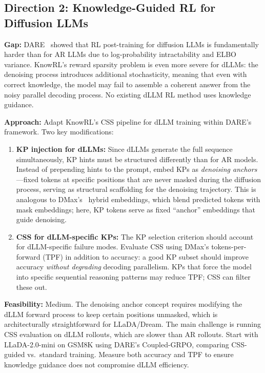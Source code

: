 \documentclass[11pt]{article}
\begin{document}
\subsection{Direction 2: Knowledge-Guided RL for Diffusion LLMs}

\textbf{Gap:} DARE~\cite{dare} showed that RL post-training for diffusion LLMs is fundamentally harder than for AR LLMs due to log-probability intractability and ELBO variance. KnowRL's reward sparsity problem is even more severe for dLLMs: the denoising process introduces additional stochasticity, meaning that even with correct knowledge, the model may fail to assemble a coherent answer from the noisy parallel decoding process. No existing dLLM RL method uses knowledge guidance.

\textbf{Approach:} Adapt KnowRL's CSS pipeline for dLLM training within DARE's framework. Two key modifications:
\begin{enumerate}
    \item \textbf{KP injection for dLLMs:} Since dLLMs generate the full sequence simultaneously, KP hints must be structured differently than for AR models. Instead of prepending hints to the prompt, embed KPs as \textit{denoising anchors}---fixed tokens at specific positions that are never masked during the diffusion process, serving as structural scaffolding for the denoising trajectory. This is analogous to DMax's~\cite{dmax} hybrid embeddings, which blend predicted tokens with mask embeddings; here, KP tokens serve as fixed ``anchor'' embeddings that guide denoising.

    \item \textbf{CSS for dLLM-specific KPs:} The KP selection criterion should account for dLLM-specific failure modes. Evaluate CSS using DMax's tokens-per-forward (TPF) in addition to accuracy: a good KP subset should improve accuracy \textit{without degrading} decoding parallelism. KPs that force the model into specific sequential reasoning patterns may reduce TPF; CSS can filter these out.
\end{enumerate}

\textbf{Feasibility:} Medium. The denoising anchor concept requires modifying the dLLM forward process to keep certain positions unmasked, which is architecturally straightforward for LLaDA/Dream. The main challenge is running CSS evaluation on dLLM rollouts, which are slower than AR rollouts. Start with LLaDA-2.0-mini on GSM8K using DARE's Coupled-GRPO, comparing CSS-guided vs.\ standard training. Measure both accuracy and TPF to ensure knowledge guidance does not compromise dLLM efficiency.
\end{document}
